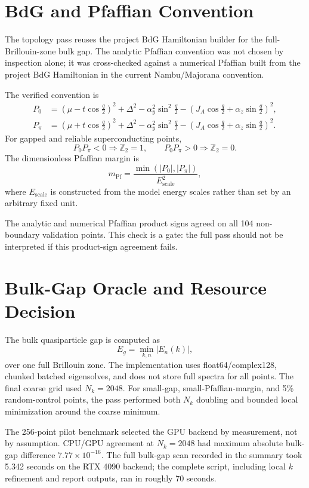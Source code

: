 \documentclass[11pt]{article}
\begin{document}
\section{BdG and Pfaffian Convention}

The topology pass reuses the project BdG Hamiltonian builder for the
full-Brillouin-zone bulk gap.  The analytic Pfaffian convention was not chosen
by inspection alone; it was cross-checked against a numerical Pfaffian built
from the project BdG Hamiltonian in the current Nambu/Majorana convention.

The verified convention is
\begin{align}
P_0 &=
\left(\mu - t\cos\frac{q}{2}\right)^2 + \Delta^2
- \alpha_y^2\sin^2\frac{q}{2}
- \left(J_A\cos\frac{q}{2}+\alpha_z\sin\frac{q}{2}\right)^2,\\
P_\pi &=
\left(\mu + t\cos\frac{q}{2}\right)^2 + \Delta^2
- \alpha_y^2\sin^2\frac{q}{2}
- \left(J_A\cos\frac{q}{2}+\alpha_z\sin\frac{q}{2}\right)^2.
\end{align}
For gapped and reliable superconducting points,
\[
P_0P_\pi < 0 \Rightarrow \mathbb{Z}_2 = 1,\qquad
P_0P_\pi > 0 \Rightarrow \mathbb{Z}_2 = 0.
\]
The dimensionless Pfaffian margin is
\[
m_{\mathrm{Pf}} =
\frac{\min(|P_0|,|P_\pi|)}{E_{\mathrm{scale}}^2},
\]
where $E_{\mathrm{scale}}$ is constructed from the model energy scales rather
than set by an arbitrary fixed unit.

The analytic and numerical Pfaffian product signs agreed on all 104
non-boundary validation points.  This check is a gate: the full pass should not
be interpreted if this product-sign agreement fails.

\section{Bulk-Gap Oracle and Resource Decision}

The bulk quasiparticle gap is computed as
\[
E_g = \min_{k,n}|E_n(k)|,
\]
over one full Brillouin zone.  The implementation uses float64/complex128,
chunked batched eigensolves, and does not store full spectra for all points.
The final coarse grid used $N_k=2048$.  For small-gap, small-Pfaffian-margin,
and 5\% random-control points, the pass performed both $N_k$ doubling and
bounded local minimization around the coarse minimum.

The 256-point pilot benchmark selected the GPU backend by measurement, not by
assumption.  CPU/GPU agreement at $N_k=2048$ had maximum absolute bulk-gap
difference $7.77\times10^{-16}$.  The full bulk-gap scan recorded in the
summary took 5.342 seconds on the RTX 4090 backend; the complete script,
including local $k$ refinement and report outputs, ran in roughly 70 seconds.
\end{document}
